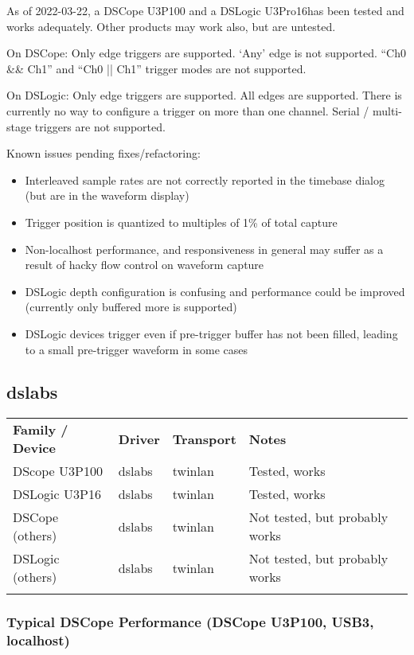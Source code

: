 As of 2022-03-22, a DSCope U3P100 and a DSLogic U3Pro16has been tested and works adequately. Other products may work
also, but are untested.

On DSCope: Only edge triggers are supported. `Any' edge is not supported. ``Ch0 \&\& Ch1'' and ``Ch0 || Ch1'' trigger modes
are not supported.

On DSLogic: Only edge triggers are supported. All edges are supported. There is currently no way to configure a trigger on more
than one channel. Serial / multi-stage triggers are not supported.

Known issues pending fixes/refactoring:
\begin{itemize}
	\item Interleaved sample rates are not correctly reported in the timebase dialog (but are in the waveform display)
	\item Trigger position is quantized to multiples of 1\% of total capture
	\item Non-localhost performance, and responsiveness in general may suffer as a result of hacky flow control on waveform capture
	\item DSLogic depth configuration is confusing and performance could be improved (currently only buffered more is supported)
	\item DSLogic devices trigger even if pre-trigger buffer has not been filled, leading to a small pre-trigger waveform in some cases
\end{itemize}

\subsection{dslabs}

\begin{tabularx}{16cm}{lllX}
\thickhline
\textbf{Family / Device} & \textbf{Driver} & \textbf{Transport} & \textbf{Notes} \\
\thickhline
DScope U3P100 & dslabs & twinlan & Tested, works\\
\thinhline
DSLogic U3P16 & dslabs & twinlan & Tested, works\\
\thinhline
DSCope (others) & dslabs & twinlan & Not tested, but probably works\\
\thinhline
DSLogic (others) & dslabs & twinlan & Not tested, but probably works\\
\thickhline
\end{tabularx}

\subsubsection{Typical DSCope Performance (DSCope U3P100, USB3, localhost)}

